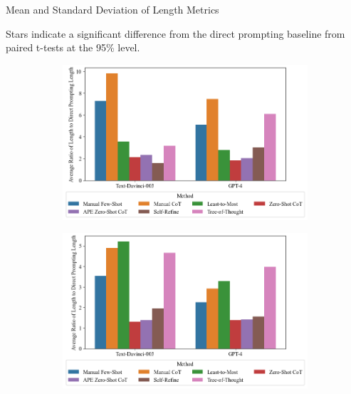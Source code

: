 \documentclass[11pt]{article}
\begin{document}
\begin{table}
  \caption{Mean and Standard Deviation of Length Metrics}
  \centering
  \tiny
    
  \label{tab:avg_length_metrics_pivot}
  \newline \newline \footnotesize Stars indicate a significant difference from the direct prompting baseline from paired t-tests at the 95\% level.
\end{table}

\begin{figure}
  \caption{Average Length vs. Direct Prompting Length}
  \begin{subfigure}[h]{0.4925\textwidth}
      \centering
      \includegraphics[width=0.95\hsize]{../Output/gsm8k_length_vs_direct_prompting_means.png} 
  \end{subfigure}
  \begin{subfigure}[h]{0.4925\textwidth}
      \centering
      \includegraphics[width=0.95\hsize]{../Output/cw_length_vs_direct_prompting_means.png}
  \end{subfigure}
  \hfill
  \label{fig:len_v_dp}
\end{figure}
\end{document}
